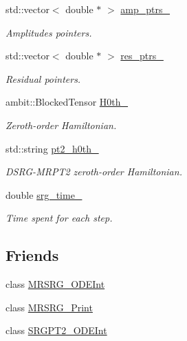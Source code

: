 \begin{DoxyCompactItemize}
std\+::vector$<$ double $\ast$ $>$ \mbox{\hyperlink{classforte_1_1_m_r_d_s_r_g_a255014ee96d1fc7b18743d9dcafa89c0}{amp\+\_\+ptrs\+\_\+}}
\begin{DoxyCompactList}\small\item\em Amplitudes pointers. \end{DoxyCompactList}\item 
std\+::vector$<$ double $\ast$ $>$ \mbox{\hyperlink{classforte_1_1_m_r_d_s_r_g_a3dbe8fe52d57fbbc3261d886e2fa80fc}{res\+\_\+ptrs\+\_\+}}
\begin{DoxyCompactList}\small\item\em Residual pointers. \end{DoxyCompactList}\item 
ambit\+::\+Blocked\+Tensor \mbox{\hyperlink{classforte_1_1_m_r_d_s_r_g_a954d089a266cd8fd6f2c9dfaf84a6a10}{H0th\+\_\+}}
\begin{DoxyCompactList}\small\item\em Zeroth-\/order Hamiltonian. \end{DoxyCompactList}\item 
std\+::string \mbox{\hyperlink{classforte_1_1_m_r_d_s_r_g_a5918c620f1c33e936ffa7c9f84e3f9c3}{pt2\+\_\+h0th\+\_\+}}
\begin{DoxyCompactList}\small\item\em D\+S\+R\+G-\/\+M\+R\+P\+T2 zeroth-\/order Hamiltonian. \end{DoxyCompactList}\item 
double \mbox{\hyperlink{classforte_1_1_m_r_d_s_r_g_a20ea6ec4ce84343df8db050a11db8534}{srg\+\_\+time\+\_\+}}
\begin{DoxyCompactList}\small\item\em Time spent for each step. \end{DoxyCompactList}\end{DoxyCompactItemize}
\subsection*{Friends}
\begin{DoxyCompactItemize}
\item 
class \mbox{\hyperlink{classforte_1_1_m_r_d_s_r_g_a29cb5d0b5db35267b86f513840939b43}{M\+R\+S\+R\+G\+\_\+\+O\+D\+E\+Int}}
\item 
class \mbox{\hyperlink{classforte_1_1_m_r_d_s_r_g_a03dd97c193a72dad6dcc76fbdd2df331}{M\+R\+S\+R\+G\+\_\+\+Print}}
\item 
class \mbox{\hyperlink{classforte_1_1_m_r_d_s_r_g_ac96e082e200ce9d034f2eeecb6ea4979}{S\+R\+G\+P\+T2\+\_\+\+O\+D\+E\+Int}}
\end{DoxyCompactItemize}



